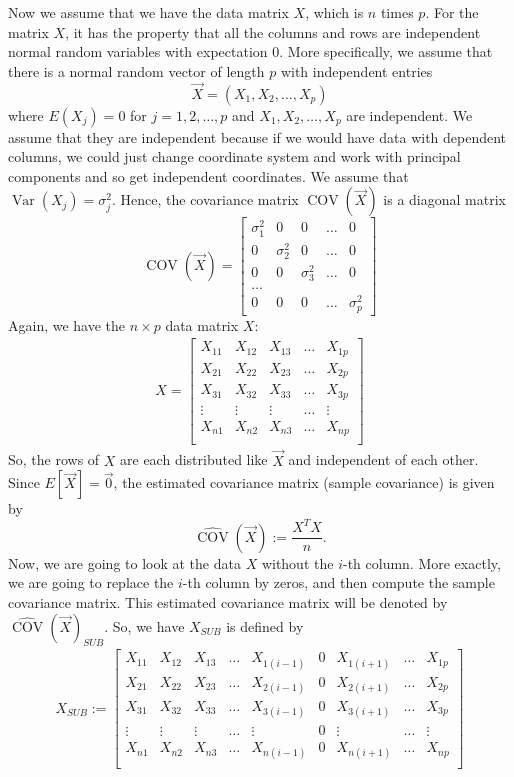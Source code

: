 \documentclass[12pt]{amsart}
\theoremstyle{definition}
\DeclareMathOperator{\Cov}{COV}
\DeclareMathOperator{\Var}{Var}
\numberwithin{equation}{section}
\numberwithin{equation}{section}
\theoremstyle{remark}
\numberwithin{equation}{section}
\begin{document}
Now we assume that we have the data matrix $X$, which is $n$ times $p$. For the matrix $X$, it has the property that all the columns and rows are independent normal random variables with expectation $0$. More specifically, we assume that there is a normal random vector of length $p$ with independent entries
$$\vec{X}=(X_1,X_2,\ldots,X_p)$$
where
$E(X_j)=0$ for $j=1,2,\ldots,p$ and $X_1,X_2,\ldots,X_p$ are independent.
We assume that they are independent because if we would have data with dependent columns, we could just
change coordinate system and work with principal components and so get independent coordinates.
We assume that $\Var(X_j)=\sigma_j^2$.
Hence, the covariance matrix $\Cov(\vec{X})$ is a diagonal matrix
\begin{equation}
\label{COV}
\Cov(\vec{X})=
\left[\begin{array}{ccccccccc}
\sigma_1^2&0&0&\ldots&0\\
0&\sigma^2_2&0&\ldots&0\\
0&0&\sigma^2_3&\ldots&0\\
\ldots\\
0&0&0&\ldots&\sigma^2_p
\end{array}\right]
\end{equation}
Again, we have the $n\times p$ data matrix $X$:
\begin{align}
X=
\left[\begin{array}{ccccccccc}
X_{11}&X_{12}&X_{13}&\ldots&X_{1p}\\
X_{21}&X_{22}&X_{23}&\ldots&X_{2p}\\
X_{31}&X_{32}&X_{33}&\ldots&X_{3p}\\
\vdots & \vdots & \vdots &\ldots & \vdots\\
X_{n1}&X_{n2}&X_{n3}&\ldots&X_{np}\\
\end{array}\right]
\end{align}
So, the rows of $X$ are each distributed like $\vec{X}$ and independent of each other.
Since $E[\vec{X}]=\vec{0}$, the estimated covariance matrix (sample covariance)
is given by
$$ \hat{\Cov}(\vec{X}):=\frac{X^T X}{n} . $$
Now, we are going to look at the data $X$ without the $i$-th column.
More exactly, we are going to replace the $i$-th column by zeros,
and then compute the sample covariance matrix. This estimated covariance matrix will
be denoted by $\hat{\Cov}(\vec{X})_{SUB}$.
So, we have $X_{SUB}$ is defined by
\begin{align*}
X_{SUB}:=
\left[\begin{array}{ccccccccc}
X_{11}&X_{12}&X_{13}&\ldots&X_{1(i-1)}&0&X_{1(i+1)}&\ldots&X_{1p}\\
X_{21}&X_{22}&X_{23}&\ldots&X_{2(i-1)}&0&X_{2(i+1)}&\ldots&X_{2p}\\
X_{31}&X_{32}&X_{33}&\ldots&X_{3(i-1)}&0&X_{3(i+1)}&\ldots&X_{3p}\\
\vdots & \vdots & \vdots &\ldots & \vdots & 0 & \vdots & \ldots &\vdots\\
X_{n1}&X_{n2}&X_{n3}&\ldots&X_{n(i-1)}&0&X_{n(i+1)}&\ldots&X_{np}\\
\end{array}\right]
\end{align*}
\end{document}
